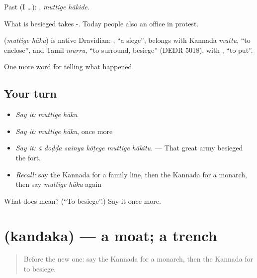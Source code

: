 Past (I …):  , \emph{muttige hākide}.

What is besieged takes -. Today people also   an office in protest.

\begin{cousinweb}
\textbf{ } (\emph{muttige hāku}) is native Dravidian: , \textquotedblleft{}a siege\textquotedblright{}, belongs with Kannada \emph{muttu}, \textquotedblleft{}to enclose\textquotedblright{}, and Tamil \emph{muṟṟu}, \textquotedblleft{}to surround, besiege\textquotedblright{} (DEDR 5018), with , \textquotedblleft{}to put\textquotedblright{}.
\end{cousinweb}

\begin{grammarlens}[title={What you've built}]
One more word for telling what happened.
\end{grammarlens}

\subsection*{Your turn}
\begin{itemize}
\raggedright
  \item \emph{Say it:} \emph{muttige hāku}
  \item \emph{Say it:} \emph{muttige hāku}, once more
  \item \emph{Say it:} \emph{ā doḍḍa sainya kōṭege muttige hākitu.} — That great army besieged the fort.
  \item \emph{Recall:} say the Kannada for a family line, then the Kannada for a monarch, then say \emph{muttige hāku} again
\end{itemize}

\begin{tcolorbox}[breakable,colback=teal!4,colframe=teal!35!black,title={Before you move on}]
What does   mean? (\textquotedblleft{}To besiege\textquotedblright{}.) Say it once more.
\end{tcolorbox}
\section[\texorpdfstring{\kn{ಕಂದಕ} (kandaka)}{ಕಂದಕ (kandaka)}]{ (kandaka) — a moat; a trench}

\label{lesson:KA-C342-kandaka}



\begin{quote}
Before the new one: say the Kannada for a monarch, then the Kannada for to besiege.
\end{quote}

